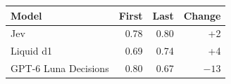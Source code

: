 \begin{tabular}{lrrr}
\toprule
Model & First & Last & Change \\
\midrule
Jev & 0.78 & 0.80 & +2 \\
Liquid d1 & 0.69 & 0.74 & +4 \\
GPT-6 Luna Decisions & 0.80 & 0.67 & $-13$ \\
\bottomrule
\end{tabular}%
